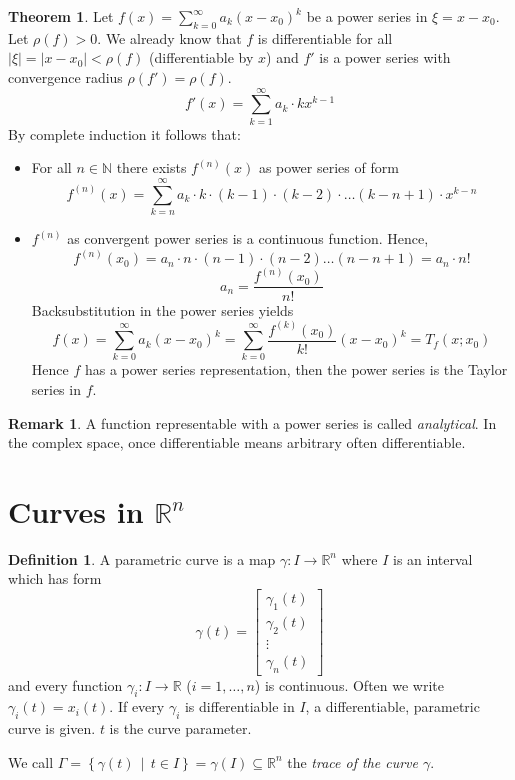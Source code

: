 \documentclass[a4paper,landscape,twocolumn]{article}
\theoremstyle{definition}
\newtheorem{theorem}{Theorem}
\newtheorem{defi}{Definition}
\newtheorem{rem}{Remark}
\newcommand\setdef[2]{\left\{#1\,\middle|\,#2\right\}}
\newcommand\abs[1]{\left|#1\right|}
\begin{document}
\begin{theorem}
  Let $f(x) = \sum_{k=0}^\infty a_k (x - x_0)^k$ be a power series in $\xi = x - x_0$.
  Let $\rho(f) > 0$. We already know that $f$ is differentiable for all $\abs{\xi} = \abs{x - x_0} < \rho(f)$ (differentiable by $x$) and $f'$ is a power series with convergence radius $\rho(f') = \rho(f)$.
  \[ f'(x) = \sum_{k=1}^\infty a_k \cdot k x^{k-1} \]
  By complete induction it follows that:
  \begin{itemize}
    \item For all $n \in \mathbb N$ there exists $f^{(n)}(x)$ as power series of form
      \[
        f^{(n)}(x)
        = \sum_{k=n}^\infty a_k \cdot k \cdot (k-1) \cdot (k-2)
          \cdot \ldots (k-n+1) \cdot x^{k-n}
      \]
    \item
      $f^{(n)}$ as convergent power series is a continuous function. Hence,
      \[ f^{(n)}(x_0) = a_n \cdot n \cdot (n-1) \cdot (n-2) \ldots (n-n+1) = a_n \cdot n! \]
      \[ a_n = \frac{f^{(n)}(x_0)}{n!} \]
      Backsubstitution in the power series yields
      \[
        f(x) = \sum_{k=0}^\infty a_k (x - x_0)^k
          = \sum_{k=0}^\infty \frac{f^{(k)}(x_0)}{k!} (x - x_0)^k
          = T_f(x; x_0)
      \]
      Hence $f$ has a power series representation, then the power series is the Taylor series in $f$.
  \end{itemize}
\end{theorem}

\begin{rem}
  A function representable with a power series is called \emph{analytical}.
  In the complex space, once differentiable means arbitrary often differentiable.
\end{rem}

\section{Curves in $\mathbb R^n$}
%
\begin{defi}
  A parametric curve is a map $\gamma: I \to \mathbb R^n$ where $I$ is an interval which has form
  \[
    \gamma(t) = \begin{bmatrix}
      \gamma_1(t) \\
      \gamma_2(t) \\
      \vdots \\
      \gamma_n(t)
    \end{bmatrix}
  \]
  and every function $\gamma_i: I \to \mathbb R$ ($i = 1, \ldots, n$) is continuous.
  Often we write $\gamma_i(t) = x_i(t)$.
  If every $\gamma_i$ is differentiable in $I$, a differentiable, parametric curve
  is given. $t$ is the curve parameter.

  We call $\Gamma = \setdef{\gamma(t)}{t \in I} = \gamma(I) \subseteq \mathbb R^n$
  the \emph{trace of the curve $\gamma$}.
\end{defi}
\end{document}
